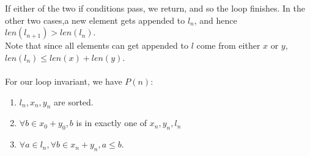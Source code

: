 \documentclass{article}
\begin{document}
If either of the two if conditions pass, we return, and so the loop finishes. In the other two cases,a  new element gets appended to $l_n$, and hence $len(l_{n+1}) > len(l_n)$.\\
Note that since all elements can get appended to $l$ come from either $x$ or $y$, $len(l_n) \leq len(x) + len(y)$.\\
\\
For our loop invariant, we have $P(n)$:
\begin{enumerate}
    \item $l_n, x_n, y_n$ are sorted.
    \item $\forall b \in x_0 + y_0, b$ is in exactly one of $x_n, y_n, l_n$
    \item $\forall a \in l_n, \forall b \in x_n + y_n, a \leq b$.
\end{enumerate}
\end{document}
